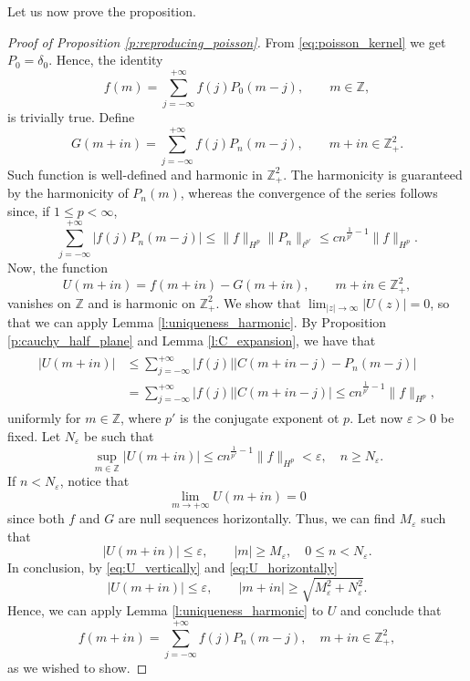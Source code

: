 \documentclass[12pt,a4paper,reqno]{amsart}
\theoremstyle{definition}
\theoremstyle{definition}\newtheorem{defn}[thm]{Definition}
\begin{document}
    \noindent Let us now prove the proposition.
    \begin{proof}[Proof of Proposition \ref{p:reproducing_poisson}]  From \eqref{eq:poisson_kernel} we get $P_0=\delta_0$. Hence, the identity
        \[
        f(m)=\sum_{j=-\infty}^{+\infty}f(j)P_0(m-j), \qquad m\in\mathbb{Z},
        \]
     is trivially true.    
     Define 
     \[
     G(m+in)=\sum_{j=-\infty}^{+\infty}f(j)P_n(m-j), \qquad m+in\in\mathbb{Z}^2_+.
     \]
     Such function is well-defined and harmonic in $\mathbb Z^2_+$. The harmonicity is guaranteed by the harmonicity of $P_n(m)$, whereas the convergence of the series follows since, if $1\leqslant p<\infty$,
     \[
     \sum_{j=-\infty}^{+\infty}|f(j)P_n(m-j)|\leqslant \|f\|_{H^p}\|P_n\|_{\ell^{p'}}\leqslant c n^{\frac1{p'}-1}\|f\|_{H^p}.
     \]
     Now, the function 
     \[
     U(m+in)=f(m+in)-G(m+in), \qquad m+in\in \mathbb Z^2_+,
     \]
     vanishes on $\mathbb Z$ and 
     is harmonic on $\mathbb Z^2_+$. We show that $\lim_{|z|\to\infty}|U(z)|=0$, so that we can apply Lemma \ref{l:uniqueness_harmonic}. By Proposition \ref{p:cauchy_half_plane} and Lemma \ref{l:C_expansion}, we have that
      \begin{align}\label{eq:U_vertically}
      \begin{split}
          |U(m+in)|&\leqslant \sum_{j=-\infty}^{+\infty}|f(j)||C(m+in-j)-P_n(m-j)|\\
    &=\sum_{j=-\infty}^{+\infty}|f(j)||C(m+in-j)|    \leqslant c  n^{\frac 1{p'}-1}\|f\|_{H^p}, 
    \end{split}
     \end{align}
     uniformly for $m\in\mathbb{Z}$, where $p'$ is the conjugate exponent ot $p$. Let now $\varepsilon>0$ be fixed. Let $N_\varepsilon$ be such that 
    \[
    \sup_{m\in\mathbb{Z}}|U(m+in)|\leqslant c n^{\frac 1{p'}-1}\|f\|_{H^p}<\varepsilon,\quad n\geqslant N_\varepsilon.
    \]
     If $n< N_\varepsilon$, notice that
    \begin{equation}\label{eq:U_horizontally}
     \lim_{m\to+\infty}U(m+in)=0
     \end{equation}
     since both $f$ and $G$ are null sequences horizontally. Thus, we can find $M_\varepsilon$ such that 
     \[
     |U(m+in)|\leqslant \varepsilon,\qquad  |m|\geqslant M_\varepsilon,\quad 0\leqslant n<N_\varepsilon.
     \]
     In conclusion, by \eqref{eq:U_vertically} and \eqref{eq:U_horizontally}
    \[
    |U(m+in)|\leqslant \varepsilon,\qquad |m+in|\geqslant \sqrt{M^2_\varepsilon+N^2_\varepsilon}.
    \]
    Hence, we can apply Lemma \ref{l:uniqueness_harmonic} to $U$ and conclude that 
    \[
    f(m+in)=\sum_{j=-\infty}^{+\infty} f(j) P_n(m-j), \quad m+in\in\mathbb Z^2_+,
    \]
    as we wished to show.
    \end{proof}
\end{document}
